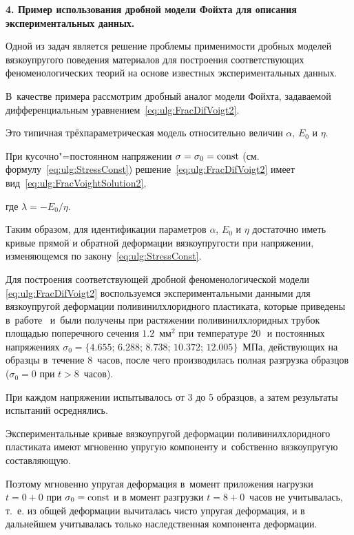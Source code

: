 \bigskip



\textbf{4. Пример использования дробной модели Фойхта для описания экспериментальных данных.}

Одной из задач является решение проблемы применимости дробных моделей вязкоупругого поведения материалов для построения соответствующих феноменологических теорий на основе известных экспериментальных данных. 

В~качестве примера рассмотрим дробный аналог модели Фойхта, задаваемой дифференциальным уравнением~\eqref{eq:ulg:FracDifVoigt2}.

Это типичная трёхпараметрическая модель относительно величин $\alpha$, $E_{0}$ и $\eta$. 

При кусочно"=постоянном напряжении $\sigma=\sigma_{0}=\rm const$ (см. формулу~\eqref{eq:ulg:StressConst}) решение~\eqref{eq:ulg:FracDifVoigt2} имеет вид~\eqref{eq:ulg:FracVoightSolution2}, 

где $\lambda=-{E_{0}}/{\eta}$. 

Таким образом, для идентификации параметров $\alpha$, $E_{0}$ и $\eta$ достаточно иметь кривые прямой и обратной деформации вязкоупругости при напряжении, изменяющемся по закону~\eqref{eq:ulg:StressConst}.



Для построения соответствующей дробной феноменологической модели \eqref{eq:ulg:FracDifVoigt2} воспользуемся экспериментальными данными для вязкоупругой деформации поливинилхлоридного пластиката, которые приведены в~работе~\cite{ulg:bib:RadchenkoGoludin} и~были получены при растяжении поливинилхлоридных трубок площадью поперечного сечения $1.2$~мм$^{2}$ при температуре 20\,\textcelsius\ и постоянных напряжениях $\sigma_{0}=\bigl\{4.655$; $6.288$; $8.738$; $10.372$; $12.005\bigr\}$~МПа, действующих на образцы  в~течение $8$~часов, после чего производилась полная разгрузка образцов ($\sigma_{0}=0$ при $t>8$~часов). 

При каждом напряжении испытывалось от 3 до 5 образцов, а затем результаты испытаний осреднялись. 



Экспериментальные кривые вязкоупругой деформации поливинилхлоридного пластиката имеют мгновенно упругую компоненту и~собственно вязкоупругую составляющую. 

Поэтому мгновенно упругая деформация в~момент приложения нагрузки $t=0+0$ при $\sigma_{0}=\rm const$ и в момент разгрузки \mbox{$t=8+0$}~часов не учитывалась, т.~е. из общей деформации вычиталась чисто упругая деформация, и в дальнейшем учитывалась только наследственная компонента деформации. 



